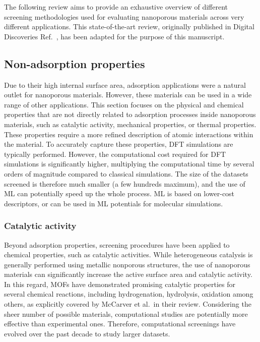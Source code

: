 \documentclass[main.tex]{subfiles}
\begin{document}
The following review aims to provide an exhaustive overview of different screening methodologies used for evaluating nanoporous materials across very different applications. This state-of-the-art review, originally published in Digital Discoveries Ref.~\cite{Ren_2022}, has been adapted for the purpose of this manuscript.

\subsection{Non-adsorption properties}

Due to their high internal surface area, adsorption applications were a natural outlet for nanoporous materials. However, these materials can be used in a wide range of other applications. This section focuses on the physical and chemical properties that are not directly related to adsorption processes inside nanoporous materials, such as catalytic activity,\autocite{Singh_2015, Greeley_2006, Back_2020}
mechanical properties,\autocite{Chibani_2019, Gaillac_2020}
or thermal properties.\autocite{Toher_2014, Sarikurt_2020, Ducamp_2021} These properties require a more refined description of atomic interactions within the material. To accurately capture these properties, DFT simulations are typically performed. However, the computational cost required for DFT simulations is significantly higher, multiplying the computational time by several orders of magnitude compared to classical simulations. The size of the datasets screened is therefore much smaller (a few hundreds maximum), and the use of ML can potentially speed up the whole process. ML is based on lower-cost descriptors,\autocite{Evans_2017, Ducamp_2022} or can be used in ML potentials for molecular simulations\autocite{Eckhoff_2019,Friederich_2021}.

\subsubsection{Catalytic activity}

Beyond adsorption properties, screening procedures have been applied to chemical properties, such as catalytic activities. While heterogeneous catalysis is generally performed using metallic nonporous structures, the use of nanoporous materials can significantly increase the active surface area and catalytic activity. In this regard, MOFs have demonstrated promising catalytic properties for several chemical reactions, including hydrogenation, hydrolysis, oxidation among others, as explicitly covered by McCarver et al.\ in their review.\autocite{McCarver_2021}
Considering the sheer number of possible materials, computational studies are potentially more effective than experimental ones. Therefore, computational screenings have evolved over the past decade to study larger datasets.
\end{document}
